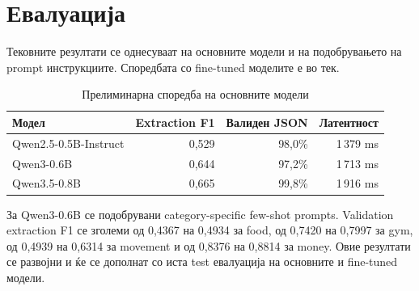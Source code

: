 \chapter{Евалуација}

Тековните резултати се однесуваат на основните модели и на подобрувањето на prompt инструкциите.
Споредбата со fine-tuned моделите е во тек.

\begin{table}[ht]
  \centering
  \small
  \begin{tabular}{lrrr}
    \toprule
    Модел & Extraction F1 & Валиден JSON & Латентност \\
    \midrule
    Qwen2.5-0.5B-Instruct & 0,529 & 98,0\% & 1\,379 ms \\
    Qwen3-0.6B & 0,644 & 97,2\% & 1\,713 ms \\
    Qwen3.5-0.8B & 0,665 & 99,8\% & 1\,916 ms \\
    \bottomrule
  \end{tabular}
  \caption{Прелиминарна споредба на основните модели}
\end{table}

За Qwen3-0.6B се подобрувани category-specific few-shot prompts.
Validation extraction F1 се зголеми од 0,4367 на 0,4934 за food, од 0,7420 на 0,7997 за gym, од 0,4939 на 0,6314 за movement и од 0,8376 на 0,8814 за money.
Овие резултати се развојни и ќе се дополнат со иста test евалуација на основните и fine-tuned модели.
